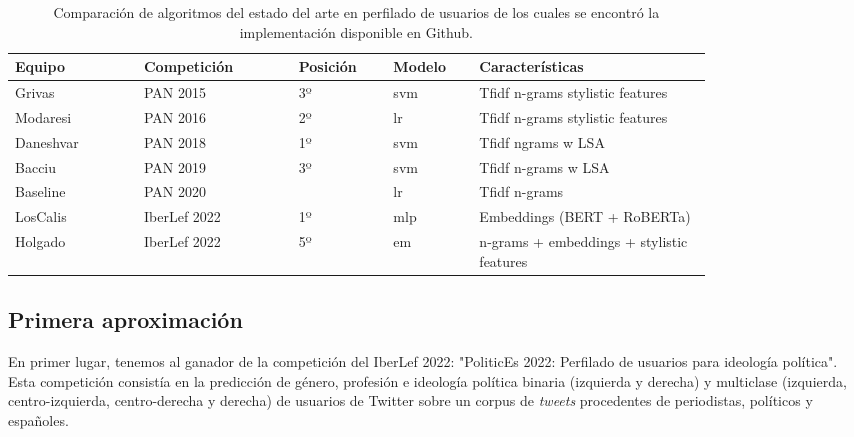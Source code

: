\begin{table}[hp!]
    \centering
    {
    \setlength{\tabcolsep}{0.4\tabcolsep}
        \begin{tabular}{|p{0.15\linewidth} |p{0.18\linewidth} |p{0.11\linewidth} |p{0.1\linewidth} | p{0.27\linewidth} |}
            \hline
            \rowcolor{udcpink!25}
            
            \textbf{Equipo} & \textbf{Competición}  & \textbf{Posición} & \textbf{Modelo} & \textbf{Características}\\ \hline
            Grivas \cite{grivas2015author} & PAN 2015 \cite{pan:2015} & 3º & \gls{svm} & Tfidf n-grams stylistic features\\
            Modaresi \cite{modaresi:2016} & PAN 2016 \cite{pan:2016} & 2º & \gls{lr} & Tfidf n-grams stylistic features\\
            Daneshvar \cite{Daneshvar2018} & PAN 2018 \cite{pan:2018} & 1º & \gls{svm} & Tfidf ngrams w LSA\\
            Bacciu \cite{bacciu2019bot} & PAN 2019 \cite{pan:2019} & 3º & \gls{svm} & Tfidf n-grams w LSA\\
            Baseline & PAN 2020 \cite{pan:2020} & & \gls{lr} & Tfidf n-grams\\
            LosCalis \cite{loscalis22} & IberLef 2022 \cite{iberlef2022} & 1º & \gls{mlp} & Embeddings (BERT + RoBERTa)\\
            Holgado \cite{holgado2022halbert} & IberLef 2022 \cite{iberlef2022} & 5º & \gls{em} & n-grams + embeddings + stylistic features\\ \hline
        \end{tabular}
    }
    \caption{Comparación de algoritmos del estado del arte en perfilado de usuarios de los cuales se encontró la implementación disponible en Github.}
    \label{tab:comparacion-profilers}
\end{table}

\subsection{Primera aproximación}
En primer lugar, tenemos al ganador de la competición del IberLef 2022: "PoliticEs 2022: Perfilado de usuarios para ideología política". Esta competición consistía en la predicción de género, profesión e ideología política binaria (izquierda y derecha) y multiclase (izquierda, centro-izquierda, centro-derecha y derecha) de usuarios de Twitter sobre un corpus de \textit{tweets} procedentes de periodistas, políticos y españoles.

